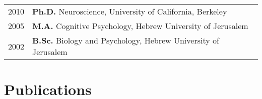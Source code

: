 \documentclass[11pt,fullpage]{article}
\begin{document}
\begin{tabular}{ll}
	2010 & {\bf Ph.D. } Neuroscience, University of California, Berkeley \\
	2005 & {\bf M.A.} Cognitive Psychology, Hebrew University of Jerusalem \\
	2002 & {\bf B.Sc.} Biology and Psychology, Hebrew University of Jerusalem \\
\end{tabular}

\section*{Publications}

\setlength{\extrarowheight}{10pt}

\begin{longtable}{p{0.5in}|p{5.5in}}


\end{longtable}
\end{document}
